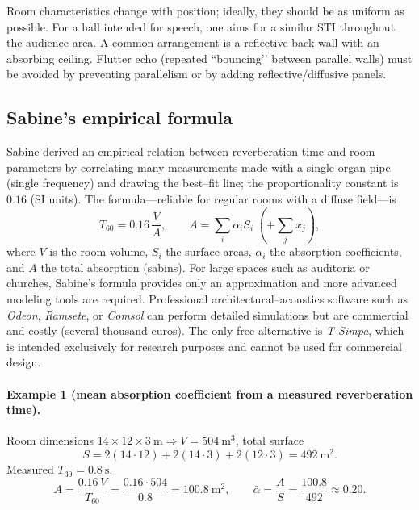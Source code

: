 Room characteristics change with position; ideally, they should be as uniform as possible. For a hall intended for speech, one aims for a similar STI throughout the audience area. A common arrangement is a reflective back wall with an absorbing ceiling. Flutter echo (repeated “bouncing’’ between parallel walls) must be avoided by preventing parallelism or by adding reflective/diffusive panels.

\subsection{Sabine’s empirical formula}
Sabine derived an empirical relation between reverberation time and room parameters by correlating many measurements made with a single organ pipe (single frequency) and drawing the best–fit line; the proportionality constant is \(0.16\) (SI units). The formula—reliable for regular rooms with a diffuse field—is
\[
T_{60}=0.16\,\frac{V}{A},\qquad 
A=\sum_i \alpha_i S_i \;(+\sum_j x_j),
\]
where \(V\) is the room volume, \(S_i\) the surface areas, \(\alpha_i\) the absorption coefficients, and \(A\) the total absorption (sabins). For large spaces such as auditoria or churches, Sabine’s formula provides only an approximation and more advanced modeling tools are required. Professional architectural–acoustics software such as \textit{Odeon}, \textit{Ramsete}, or \textit{Comsol} can perform detailed simulations but are commercial and costly (several thousand euros). The only free alternative is \textit{T-Simpa}, which is intended exclusively for research purposes and cannot be used for commercial design.


\paragraph{Example 1 (mean absorption coefficient from a measured reverberation time).}
Room dimensions \(14\times12\times3~\mathrm{m}\Rightarrow V=504~\mathrm{m^3}\), total surface
\[
S=2(14\cdot12)+2(14\cdot3)+2(12\cdot3)=492~\mathrm{m^2}.
\]
Measured \(T_{30}=0.8~\mathrm{s}\).
\[
A=\frac{0.16\,V}{T_{60}}=\frac{0.16\cdot504}{0.8}=100.8~\mathrm{m^2},\qquad
\bar\alpha=\frac{A}{S}=\frac{100.8}{492}\approx\mathbf{0.20}.
\]

